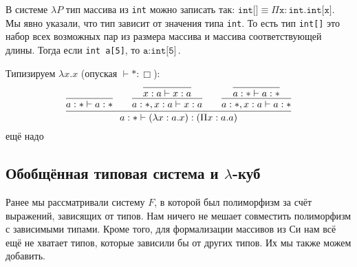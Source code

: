 В системе $\lambda P$ тип массива из \texttt{int} можно записать так:
$\texttt{int[]} \equiv \Pi \texttt{x} : \texttt{int}.\texttt{int[x]}$.
Мы явно указали, что тип зависит от значения типа \texttt{int}.
То есть тип \texttt{int[]} это набор всех возможных пар из размера массива и массива соответствующей длины.
Тогда если \texttt{int a[5]}, то $\texttt{a}:\texttt{int[5]}$.

\begin{example}
Типизируем $\lambda x . x$ (опуская $\vdash * : \Box$):
\[
    \infer{a : * \vdash (\lambda x : a . x) : (\Pi x : a . a)}
        { \infer{a : * \vdash a : *}{}
        &&\infer{a : *, x : a \vdash x : a}{\infer{x : a \vdash x : a}{}}
        &&\infer{a : *, x : a \vdash a : *}{\infer{a : * \vdash a : *}{}}
        }
\]
\todo ещё надо
\end{example}

\subsection{\texorpdfstring{Обобщённая типовая система и $\lambda$-куб}{Generalized type system and lambda cube}}

Ранее мы рассматривали систему $F$, в которой был полиморфизм за счёт выражений, зависящих от типов.
Нам ничего не мешает совместить полиморфизм с зависимыми типами.
Кроме того, для формализации массивов из Си нам всё ещё не хватает типов, которые зависили бы от других типов.
Их мы также можем добавить.

